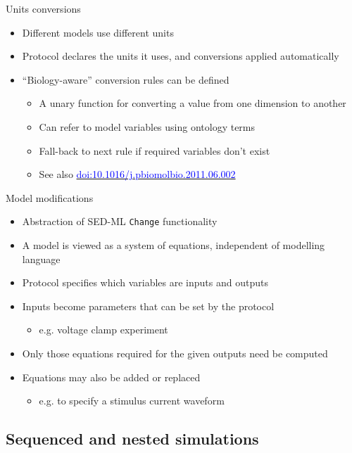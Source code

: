 \documentclass[t,xcolor={usenames,dvipsnames}]{beamer}
\newcommand{\myhref}[2]{\href{#1}{\textcolor{Blue}{#2}}}
\newcommand{\doi}[1]{\myhref{http://dx.doi.org/#1}{doi:#1}}
\newcommand{\subitem}[1]{\begin{itemize}[<.->]\item #1 \end{itemize}}
\begin{document}
\begin{frame}{Units conversions}
\begin{itemize}
\item Different models use different units
\item Protocol declares the units it uses, and conversions applied automatically
\item ``Biology-aware'' conversion rules can be defined
  \begin{itemize}
  \item A unary function for converting a value from one dimension to another
  \item Can refer to model variables using ontology terms
  \item Fall-back to next rule if required variables don't exist
  \item See also \doi{10.1016/j.pbiomolbio.2011.06.002}
  \end{itemize}
\end{itemize}
\end{frame}

\begin{frame}{Model modifications}
\begin{itemize}
\item Abstraction of SED-ML \texttt{Change} functionality
\item A model is viewed as a \alert{system of equations}, independent of modelling language
\item<2-> Protocol specifies which variables are \alert{inputs} and \alert{outputs}
\item<2-> Inputs become parameters that can be set by the protocol
  \subitem{e.g. voltage clamp experiment}
\item<2-> Only those equations required for the given outputs need be computed
\item<3-> Equations may also be \alert{added or replaced}
  \subitem{e.g. to specify a stimulus current waveform}
\end{itemize}
\end{frame}

\subsection{Sequenced and nested simulations}
\end{document}
